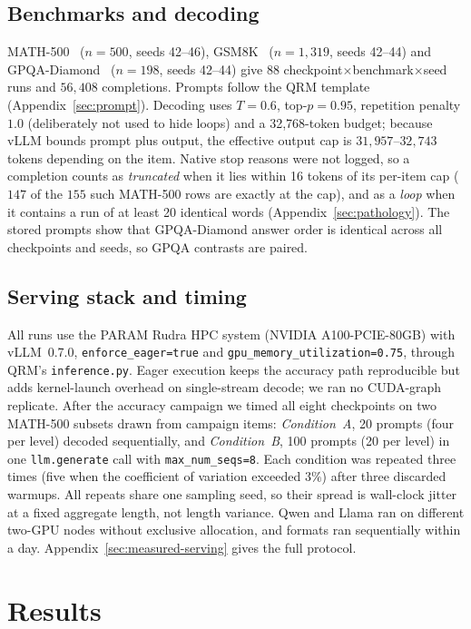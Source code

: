 \documentclass[11pt,a4paper]{article}
\begin{document}
\subsection{Benchmarks and decoding}
MATH-500~\cite{hendrycks2021math,lightman2023lets} ($n=500$, seeds 42--46), GSM8K~\cite{cobbe2021gsm8k} ($n=1{,}319$, seeds 42--44) and GPQA-Diamond~\cite{rein2023gpqa} ($n=198$, seeds 42--44) give 88 checkpoint$\times$benchmark$\times$seed runs and $56{,}408$ completions. Prompts follow the QRM template (Appendix~\ref{sec:prompt}). Decoding uses $T=0.6$, top-$p=0.95$, repetition penalty $1.0$ (deliberately not used to hide loops) and a 32{,}768-token budget; because vLLM bounds prompt plus output, the effective output cap is $31{,}957$--$32{,}743$ tokens depending on the item. Native stop reasons were not logged, so a completion counts as \emph{truncated} when it lies within 16 tokens of its per-item cap ($147$ of the $155$ such MATH-500 rows are exactly at the cap), and as a \emph{loop} when it contains a run of at least 20 identical words (Appendix~\ref{sec:pathology}). The stored prompts show that GPQA-Diamond answer order is identical across all checkpoints and seeds, so GPQA contrasts are paired.

\subsection{Serving stack and timing}
All runs use the PARAM Rudra HPC system (NVIDIA A100-PCIE-80GB) with vLLM~0.7.0, \texttt{enforce\_eager=true} and \texttt{gpu\_memory\_utilization=0.75}, through QRM's \texttt{inference.py}. Eager execution keeps the accuracy path reproducible but adds kernel-launch overhead on single-stream decode; we ran no CUDA-graph replicate. After the accuracy campaign we timed all eight checkpoints on two MATH-500 subsets drawn from campaign items: \emph{Condition~A}, 20 prompts (four per level) decoded sequentially, and \emph{Condition~B}, 100 prompts (20 per level) in one \texttt{llm.generate} call with \texttt{max\_num\_seqs=8}. Each condition was repeated three times (five when the coefficient of variation exceeded $3\%$) after three discarded warmups. All repeats share one sampling seed, so their spread is wall-clock jitter at a fixed aggregate length, not length variance. Qwen and Llama ran on different two-GPU nodes without exclusive allocation, and formats ran sequentially within a day. Appendix~\ref{sec:measured-serving} gives the full protocol.

\section{Results}
\label{sec:results}
\end{document}
